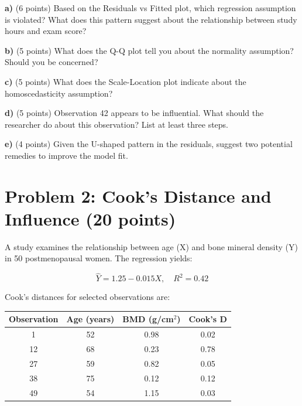 \documentclass[11pt]{article}
\begin{document}
\vspace{0.5cm}

\textbf{a)} (6 points) Based on the Residuals vs Fitted plot, which regression assumption is violated? What does this pattern suggest about the relationship between study hours and exam score?

\vspace{3cm}

\textbf{b)} (5 points) What does the Q-Q plot tell you about the normality assumption? Should you be concerned?

\vspace{2.5cm}

\textbf{c)} (5 points) What does the Scale-Location plot indicate about the homoscedasticity assumption?

\vspace{2.5cm}

\textbf{d)} (5 points) Observation 42 appears to be influential. What should the researcher do about this observation? List at least three steps.

\vspace{3cm}

\textbf{e)} (4 points) Given the U-shaped pattern in the residuals, suggest two potential remedies to improve the model fit.

\vspace{2.5cm}

\newpage

\section*{Problem 2: Cook's Distance and Influence (20 points)}

A study examines the relationship between age (X) and bone mineral density (Y) in 50 postmenopausal women. The regression yields:

$$\hat{Y} = 1.25 - 0.015X, \quad R^2 = 0.42$$

Cook's distances for selected observations are:

\begin{center}
\begin{tabular}{cccc}
\toprule
Observation & Age (years) & BMD (g/cm$^2$) & Cook's D \\
\midrule
1 & 52 & 0.98 & 0.02 \\
12 & 68 & 0.23 & 0.78 \\
27 & 59 & 0.82 & 0.05 \\
38 & 75 & 0.12 & 0.12 \\
49 & 54 & 1.15 & 0.03 \\
\bottomrule
\end{tabular}
\end{center}
\end{document}
